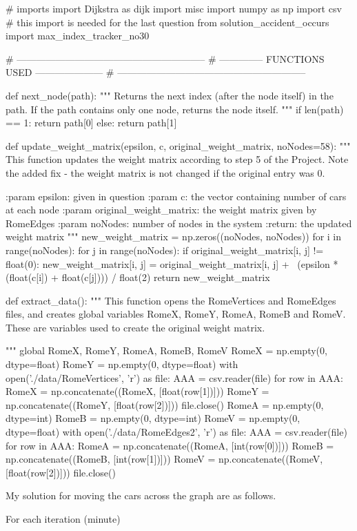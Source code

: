 \documentclass[paper=a4, fontsize=12pt]{scrartcl} %
\numberwithin{equation}{section}       %
\numberwithin{figure}{section}         %
\numberwithin{table}{section}          %
\begin{document}
\begin{python}
# imports
import Dijkstra as dijk
import misc
import numpy as np
import csv
# this import is needed for the last question
from solution_accident_occurs import max_index_tracker_no30


# -----------------------------------------------------------
# --------------    FUNCTIONS USED     ---------------------
# -----------------------------------------------------------

def next_node(path):
    """ Returns the next index (after the node itself) in the path.
        If the path contains only one node, returns the node itself.
    """
    if len(path) == 1:
        return path[0]
    else:
        return path[1]
        
        
def update_weight_matrix(epsilon, c, original_weight_matrix, noNodes=58):
    """
    This function updates the weight matrix according to step 5 of the
    Project. Note the added fix - the weight matrix is not changed if
    the original entry was 0.



    :param epsilon: given in question
    :param c: the vector containing number of cars at each node
    :param original_weight_matrix: the weight matrix given by RomeEdges
    :param noNodes: number of nodes in the system
    :return: the updated weight matrix
    """
    new_weight_matrix = np.zeros((noNodes, noNodes))
    for i in range(noNodes):
        for j in range(noNodes):
            if original_weight_matrix[i, j] != float(0):
                new_weight_matrix[i, j] = original_weight_matrix[i, j] + \
                                          (epsilon * (float(c[i]) +
                                                      float(c[j]))) / float(2)
    return new_weight_matrix

def extract_data():
    """
    This function opens the RomeVertices and RomeEdges files, and creates
    global variables RomeX, RomeY, RomeA, RomeB and RomeV. These are variables
    used to create the original weight matrix.

    """
    global RomeX, RomeY, RomeA, RomeB, RomeV
    RomeX = np.empty(0, dtype=float)
    RomeY = np.empty(0, dtype=float)
    with open('./data/RomeVertices', 'r') as file:
        AAA = csv.reader(file)
        for row in AAA:
            RomeX = np.concatenate((RomeX, [float(row[1])]))
            RomeY = np.concatenate((RomeY, [float(row[2])]))
    file.close()
    RomeA = np.empty(0, dtype=int)
    RomeB = np.empty(0, dtype=int)
    RomeV = np.empty(0, dtype=float)
    with open('./data/RomeEdges2', 'r') as file:
        AAA = csv.reader(file)
        for row in AAA:
            RomeA = np.concatenate((RomeA, [int(row[0])]))
            RomeB = np.concatenate((RomeB, [int(row[1])]))
            RomeV = np.concatenate((RomeV, [float(row[2])]))
    file.close()

\end{python}

My solution for moving the cars across the graph are as follows.

For each iteration (minute)
\end{document}

